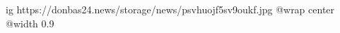  
 
 
 
 

\ifcmt
  ig https://donbas24.news/storage/news/psvhuojf5sv9oukf.jpg
  @wrap center
  @width 0.9
\fi
